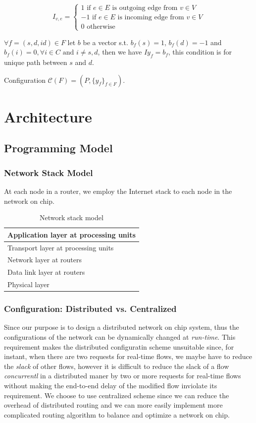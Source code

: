 \documentclass[conference, twocolumn]{IEEEtran}
\theoremstyle{definition}
\begin{document}
\begin{equation}
I_{v,e} = \left\{ \begin{array}{lrc}
1 \mbox{ if } e \in E \mbox{ is outgoing edge from } v \in V \\
-1 \mbox{ if } e \in E \mbox{ is incoming edge from } v \in V \\
0 \mbox{ otherwise}
\end{array}\right. 
\end{equation}

$\forall f=(s, d, id) \in F$  let $b$ be a vector s.t. $b_f(s) = 1$, 
$b_f(d) = -1$ and $b_f(i) = 0, \forall i \in C \mbox{ and } i \neq s, d$,
 then we have $Iy_f=b_f$, this condition is for unique path between $s$ and $d$.

Configuration $\mathcal{C}(F)=(P, \{y_f\}_{f \in F})$.
\section{Architecture}
\subsection{Programming Model}
\subsubsection{Network Stack Model}
At each node in a router, we employ the Internet stack to each node in the 
network on chip.
\begin{table}[h]
\begin{center}
  \begin{tabular}{ | l | }
    \hline
    Application layer at processing units \\ \hline
    Transport layer at processing units \\ \hline
    Network layer at routers \\ \hline
	Data link layer at routers \\ \hline
	Physical layer \\
    \hline
  \end{tabular}
\end{center}
\caption{Network stack model}
\label{table:NetworkStack}
\end{table}

\subsubsection{Configuration: Distributed vs. Centralized}
Since our purpose is to design a distributed network on chip system, thus the
configurations of the network can be dynamically changed at {\em run-time}.
This requirement makes the distributed configuratin scheme unsuitable since,
for instant, when there are two requests for real-time flows, we maybe have to
reduce the {\em slack} of other flows, however it is difficult to reduce the
slack of a flow {\em concurrentl} in a distributed maner by two or more
requests for real-time flows without making the end-to-end delay of the
modified flow inviolate its requirement. We choose to use centralized scheme
since we can reduce the overhead of distributed routing and we can more easily
implement more complicated routing algorithm to balance and optimize a network
on chip.
\end{document}
